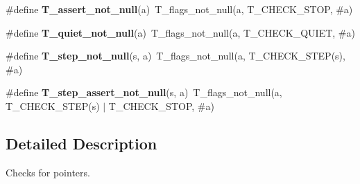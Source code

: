 \begin{DoxyCompactItemize}
\item 
\mbox{\label{group__RTEMSTestFrameworkChecksPointer_ga698b2de3fe7439e0c0d08383d720128d}} 
\#define {\bfseries T\+\_\+assert\+\_\+not\+\_\+null}(a)~T\+\_\+flags\+\_\+not\+\_\+null(a, T\+\_\+\+C\+H\+E\+C\+K\+\_\+\+S\+T\+OP, \#a)
\item 
\mbox{\label{group__RTEMSTestFrameworkChecksPointer_ga7472c01853a6e57edfc0f7798b96ecbd}} 
\#define {\bfseries T\+\_\+quiet\+\_\+not\+\_\+null}(a)~T\+\_\+flags\+\_\+not\+\_\+null(a, T\+\_\+\+C\+H\+E\+C\+K\+\_\+\+Q\+U\+I\+ET, \#a)
\item 
\mbox{\label{group__RTEMSTestFrameworkChecksPointer_ga294c1965d0da8a38b7f889865b02fd70}} 
\#define {\bfseries T\+\_\+step\+\_\+not\+\_\+null}(s,  a)~T\+\_\+flags\+\_\+not\+\_\+null(a, T\+\_\+\+C\+H\+E\+C\+K\+\_\+\+S\+T\+EP(s), \#a)
\item 
\mbox{\label{group__RTEMSTestFrameworkChecksPointer_ga0e7abe7ab539ff2badd2b99a6794302b}} 
\#define {\bfseries T\+\_\+step\+\_\+assert\+\_\+not\+\_\+null}(s,  a)~T\+\_\+flags\+\_\+not\+\_\+null(a, T\+\_\+\+C\+H\+E\+C\+K\+\_\+\+S\+T\+EP(s) $\vert$ T\+\_\+\+C\+H\+E\+C\+K\+\_\+\+S\+T\+OP, \#a)
\end{DoxyCompactItemize}


\subsection{Detailed Description}
Checks for pointers. 

